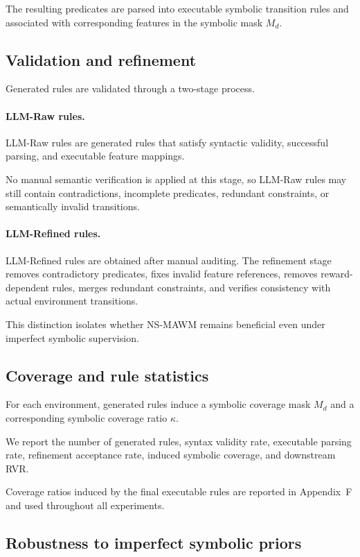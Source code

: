\documentclass{article}
\theoremstyle{plain}
\theoremstyle{definition}
\theoremstyle{remark}
\begin{document}
The resulting predicates are parsed into executable symbolic transition rules
and associated with corresponding features in the symbolic mask $M_d$.

\subsection{Validation and refinement}

Generated rules are validated through a two-stage process.

\paragraph{LLM-Raw rules.}
LLM-Raw rules are generated rules that satisfy syntactic validity, successful parsing, and executable feature mappings.

No manual semantic verification is applied at this stage, so
LLM-Raw rules may still contain contradictions, incomplete predicates, redundant constraints, or semantically invalid transitions.

\paragraph{LLM-Refined rules.}
LLM-Refined rules are obtained after manual auditing. The refinement stage removes contradictory predicates, fixes invalid feature references, removes reward-dependent rules, merges redundant constraints, and verifies consistency with actual environment transitions.

This distinction isolates whether NS-MAWM remains beneficial even
under imperfect symbolic supervision.

\subsection{Coverage and rule statistics}

For each environment, generated rules induce a symbolic coverage mask $M_d$
and a corresponding symbolic coverage ratio $\kappa$.

We report the number of generated rules, syntax validity rate, executable parsing rate, refinement acceptance rate, induced symbolic coverage, and downstream RVR.

Coverage ratios induced by the final executable rules are reported in
Appendix~F and used throughout all experiments.

\subsection{Robustness to imperfect symbolic priors}
\end{document}
